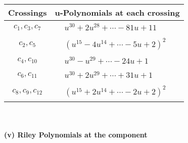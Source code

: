 \documentclass[1p]{elsarticle_modified}
\theoremstyle{definition}
\begin{document}
\begin{tabular}{m{50pt}|m{274pt}}
Crossings & \hspace{64pt}u-Polynomials at each crossing \\
\hline $$\begin{aligned}c_{1},c_{3},c_{7}\end{aligned}$$&$\begin{aligned}
&u^{30}+2 u^{28}+\cdots-81 u+11
\end{aligned}$\\
\hline $$\begin{aligned}c_{2},c_{5}\end{aligned}$$&$\begin{aligned}
&(u^{15}-4 u^{14}+\cdots-5 u+2)^{2}
\end{aligned}$\\
\hline $$\begin{aligned}c_{4},c_{10}\end{aligned}$$&$\begin{aligned}
&u^{30}- u^{29}+\cdots-24 u+1
\end{aligned}$\\
\hline $$\begin{aligned}c_{6},c_{11}\end{aligned}$$&$\begin{aligned}
&u^{30}+2 u^{29}+\cdots+31 u+1
\end{aligned}$\\
\hline $$\begin{aligned}c_{8},c_{9},c_{12}\end{aligned}$$&$\begin{aligned}
&(u^{15}+2 u^{14}+\cdots-2 u+2)^{2}
\end{aligned}$\\
\hline
\end{tabular}\\~\\
\newpage\renewcommand{\arraystretch}{1}
\flushleft \textbf{(v) Riley Polynomials at the component}\newline \\
\end{document}
